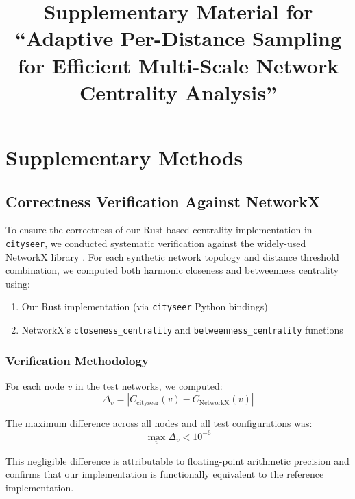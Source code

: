 \documentclass[11pt,a4paper]{article}
\title{Supplementary Material for\\``Adaptive Per-Distance Sampling for Efficient Multi-Scale Network Centrality Analysis''}
\author{}
\date{}
\newcommand{\cityseer}{\texttt{cityseer}}
\begin{document}
\maketitle

\tableofcontents
\newpage

\section{Supplementary Methods}
\label{sec:supp_methods}

\subsection{Correctness Verification Against NetworkX}
\label{sec:networkx_verification}

To ensure the correctness of our Rust-based centrality implementation in \cityseer{}, we conducted systematic verification against the widely-used NetworkX library \citep{Hagberg2008}. For each synthetic network topology and distance threshold combination, we computed both harmonic closeness and betweenness centrality using:

\begin{enumerate}
    \item Our Rust implementation (via \cityseer{} Python bindings)
    \item NetworkX's \texttt{closeness\_centrality} and \texttt{betweenness\_centrality} functions
\end{enumerate}

\subsubsection{Verification Methodology}

For each node $v$ in the test networks, we computed:
\begin{equation}
    \Delta_v = |C_{\text{cityseer}}(v) - C_{\text{NetworkX}}(v)|
\end{equation}

The maximum difference across all nodes and all test configurations was:
\begin{equation}
    \max_v \Delta_v < 10^{-6}
\end{equation}

This negligible difference is attributable to floating-point arithmetic precision and confirms that our implementation is functionally equivalent to the reference implementation.
\end{document}
